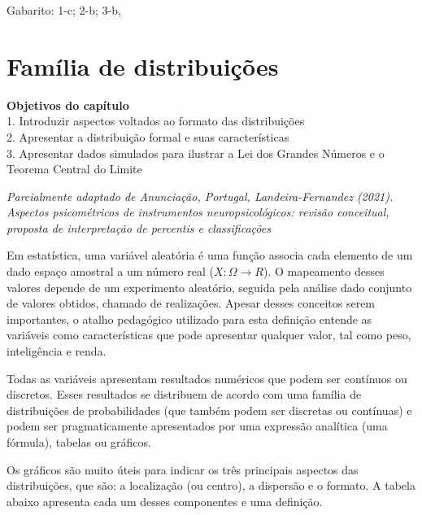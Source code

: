 \documentclass[
]{book}
\begin{document}
\begin{mirror}

Gabarito: 1-c; 2-b; 3-b,

\end{mirror}

\hypertarget{famuxedlia-de-distribuiuxe7uxf5es}{%
\chapter{Família de distribuições}\label{famuxedlia-de-distribuiuxe7uxf5es}}

\begin{objectives}
\textbf{Objetivos do capítulo}\\
1. Introduzir aspectos voltados ao formato das distribuições\\
2. Apresentar a distribuição formal e suas características\\
3. Apresentar dados simulados para ilustrar a Lei dos Grandes Números e
o Teorema Central do Limite
\end{objectives}

\emph{Parcialmente adaptado de Anunciação, Portugal, Landeira-Fernandez (2021). Aspectos psicométricos de instrumentos neuropsicológicos: revisão conceitual, proposta de interpretação de percentis e classificações }

Em estatística, uma variável aleatória é uma função associa cada elemento de um dado espaço amostral a um número real (\(X:\Omega \rightarrow R\)). O mapeamento desses valores depende de um experimento aleatório, seguida pela análise dado conjunto de valores obtidos, chamado de realizações. Apesar desses conceitos serem importantes, o atalho pedagógico utilizado para esta definição entende as variáveis como características que pode apresentar qualquer valor, tal como peso, inteligência e renda.

Todas as variáveis apresentam resultados numéricos que podem ser contínuos ou discretos. Esses resultados se distribuem de acordo com uma família de distribuições de probabilidades (que também podem ser discretas ou contínuas) e podem ser pragmaticamente apresentados por uma expressão analítica (uma fórmula), tabelas ou gráficos.

Os gráficos são muito úteis para indicar os três principais aspectos das distribuições, que são: a localização (ou centro), a dispersão e o formato. A tabela abaixo apresenta cada um desses componentes e uma definição.
\end{document}
